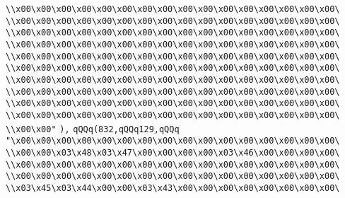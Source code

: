 \verb|\\x00\x00\x00\x00\x00\x00\x00\x00\x00\x00\x00\x00\x00\x00\x00\x00\|\newline
\verb|\\x00\x00\x00\x00\x00\x00\x00\x00\x00\x00\x00\x00\x00\x00\x00\x00\|\newline
\verb|\\x00\x00\x00\x00\x00\x00\x00\x00\x00\x00\x00\x00\x00\x00\x00\x00\|\newline
\verb|\\x00\x00\x00\x00\x00\x00\x00\x00\x00\x00\x00\x00\x00\x00\x00\x00\|\newline
\verb|\\x00\x00\x00\x00\x00\x00\x00\x00\x00\x00\x00\x00\x00\x00\x00\x00\|\newline
\verb|\\x00\x00\x00\x00\x00\x00\x00\x00\x00\x00\x00\x00\x00\x00\x00\x00\|\newline
\verb|\\x00\x00\x00\x00\x00\x00\x00\x00\x00\x00\x00\x00\x00\x00\x00\x00\|\newline
\verb|\\x00\x00\x00\x00\x00\x00\x00\x00\x00\x00\x00\x00\x00\x00\x00\x00\|\newline
\verb|\\x00\x00\x00\x00\x00\x00\x00\x00\x00\x00\x00\x00\x00\x00\x00\x00\|\newline
\verb|\\x00\x00\x00\x00\x00\x00\x00\x00\x00\x00\x00\x00\x00\x00\x00\x00\|\newline
\verb|\\x00\x00"|\newline
\verb|),|\newline
\verb|qQQq(832,qQQq129,qQQq|\newline
\verb|"\x00\x00\x00\x00\x00\x00\x00\x00\x00\x00\x00\x00\x00\x00\x00\x00\|\newline
\verb|\\x00\x00\x03\x48\x03\x47\x00\x00\x00\x00\x03\x46\x00\x00\x00\x00\|\newline
\verb|\\x00\x00\x00\x00\x00\x00\x00\x00\x00\x00\x00\x00\x00\x00\x00\x00\|\newline
\verb|\\x00\x00\x00\x00\x00\x00\x00\x00\x00\x00\x00\x00\x00\x00\x00\x00\|\newline
\verb|\\x03\x45\x03\x44\x00\x00\x03\x43\x00\x00\x00\x00\x00\x00\x00\x00\|\newline
